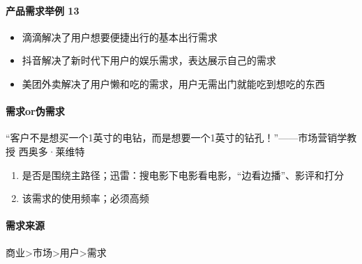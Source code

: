 \documentclass[letterpaper,10pt,english]{sphinxmanual}
\begin{document}
\paragraph{产品需求举例 13\sphinxfootnotemark[26]}
\label{\detokenize{chapter_introduction/need:id3}}%
\begin{footnotetext}[26]\sphinxAtStartFootnote
{}
%
\end{footnotetext}\ignorespaces \begin{itemize}
\item {} 
滴滴解决了用户想要便捷出行的基本出行需求

\item {} 
抖音解决了新时代下用户的娱乐需求，表达展示自己的需求

\item {} 
美团外卖解决了用户懒和吃的需求，用户无需出门就能吃到想吃的东西

\end{itemize}


\paragraph{需求or伪需求}
\label{\detokenize{chapter_introduction/need:or}}
“客户不是想买一个1英寸的电钻，而是想要一个1英寸的钻孔！”——市场营销学教授
西奥多·莱维特
\begin{enumerate}
%
\item {} 
是否是围绕主路径；迅雷：搜电影\sphinxhyphen{}下电影\sphinxhyphen{}看电影，“边看边播”、影评和打分%
\begin{footnote}[27]\sphinxAtStartFootnote
{}
%
\end{footnote}

\item {} 
该需求的使用频率；必须高频

\end{enumerate}


\paragraph{需求来源}
\label{\detokenize{chapter_introduction/need:id4}}
商业\sphinxhyphen{}>市场\sphinxhyphen{}>用户\sphinxhyphen{}>需求%
\begin{footnote}[28]\sphinxAtStartFootnote
{}
%
\end{footnote}
\end{document}

